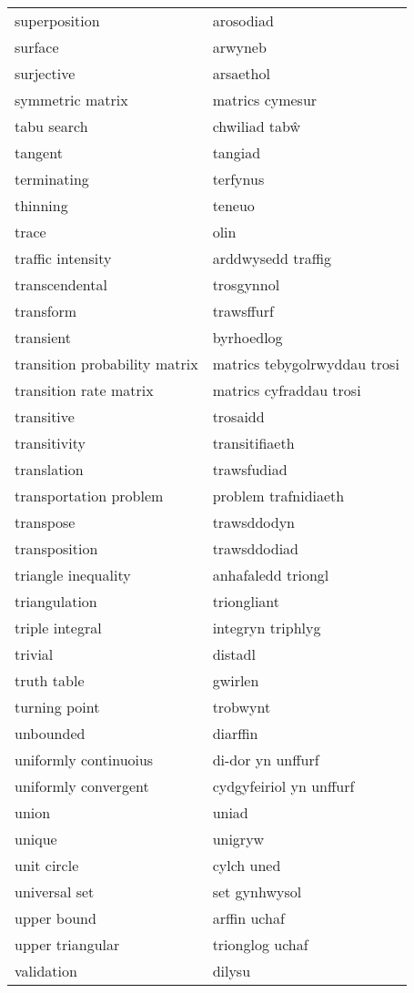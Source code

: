 \begin{supertabular}{p{0.22\textwidth}p{0.22\textwidth}}
superposition & arosodiad \\
surface & arwyneb \\
surjective & arsaethol \\
symmetric matrix & matrics cymesur \\
tabu search & chwiliad tabŵ \\
tangent & tangiad \\
terminating & terfynus \\
thinning & teneuo \\
trace & olin \\
traffic intensity & arddwysedd traffig \\
transcendental & trosgynnol \\
transform & trawsffurf \\
transient & byrhoedlog \\
transition probability matrix & matrics tebygolrwyddau trosi \\
transition rate matrix & matrics cyfraddau trosi \\
transitive & trosaidd \\
transitivity & transitifiaeth \\
translation & trawsfudiad \\
transportation problem & problem trafnidiaeth \\
transpose & trawsddodyn \\
transposition & trawsddodiad \\
triangle inequality & anhafaledd triongl \\
triangulation & triongliant \\
triple integral & integryn triphlyg \\
trivial & distadl \\
truth table & gwirlen \\
turning point & trobwynt \\
unbounded & diarffin \\
uniformly continuoius & di-dor yn unffurf \\
uniformly convergent & cydgyfeiriol yn unffurf \\
union & uniad \\
unique & unigryw \\
unit circle & cylch uned \\
universal set & set gynhwysol \\
upper bound & arffin uchaf \\
upper triangular & trionglog uchaf \\
validation & dilysu \\

\end{supertabular}
